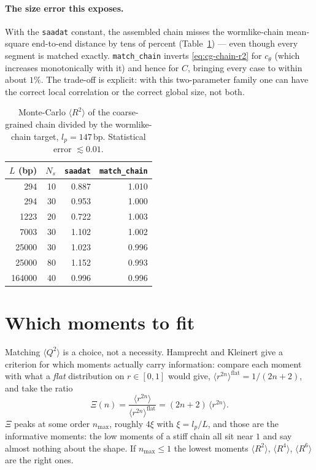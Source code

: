 \documentclass[11pt,a4paper]{report}
\newcommand{\code}[1]{\texttt{\seqsplitcode{#1}}}
\newcommand{\seqsplitcode}[1]{#1}
\begin{document}
\paragraph{The size error this exposes.} With the \code{saadat} constant, the
assembled chain misses the wormlike-chain mean-square end-to-end distance by tens
of percent (Table~\ref{tab:cg-chain}) --- even though every segment is matched
exactly. \code{match\_chain} inverts \eqref{eq:cg-chain-r2} for $c_\theta$ (which
increases monotonically with it) and hence for $C$, bringing every case to within
about $1\%$. The trade-off is explicit: with this two-parameter family one can
have the correct local correlation or the correct global size, not both.

\begin{table}[ht]
\centering
\caption{Monte-Carlo $\langle R^{2}\rangle$ of the coarse-grained chain divided by
the wormlike-chain target, $l_p = 147$\,bp. Statistical error $\lesssim 0.01$.}
\label{tab:cg-chain}
\begin{tabular}{@{}rrrr@{}}
\toprule
$L$ (bp) & $N_s$ & \code{saadat} & \code{match\_chain} \\
\midrule
294    & 10 & 0.887 & 1.010 \\
294    & 30 & 0.953 & 1.000 \\
1223   & 20 & 0.722 & 1.003 \\
7003   & 30 & 1.102 & 1.002 \\
25000  & 30 & 1.023 & 0.996 \\
25000  & 80 & 1.152 & 0.993 \\
164000 & 40 & 0.996 & 0.996 \\
\bottomrule
\end{tabular}
\end{table}

\section{Which moments to fit}
\label{sec:cg-hk}

Matching $\langle Q^{2}\rangle$ is a choice, not a necessity. Hamprecht and
Kleinert give a criterion for which moments actually carry information: compare
each moment with what a \emph{flat} distribution on $r\in[0,1]$ would give,
$\langle r^{2n}\rangle^{\mathrm{flat}} = 1/(2n+2)$, and take the ratio
\begin{equation}
  \Xi(n) = \frac{\langle r^{2n}\rangle}{\langle r^{2n}\rangle^{\mathrm{flat}}}
         = (2n+2)\,\langle r^{2n}\rangle .
\end{equation}
$\Xi$ peaks at some order $n_{\max}$, roughly $4\xi$ with $\xi = l_p/L$, and those
are the informative moments: the low moments of a stiff chain all sit near $1$ and
say almost nothing about the shape. If $n_{\max}\le1$ the lowest moments
$\langle R^{2}\rangle$, $\langle R^{4}\rangle$, $\langle R^{6}\rangle$ are the
right ones.
\end{document}

